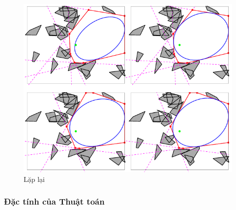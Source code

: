 \documentclass{article}
\begin{document}
\begin{figure}[!htp]
    \centering
    \includegraphics[width=0.5\linewidth]{imgs/iris-3.png}
    \caption{Lặp lại}
\end{figure}

\newpage
\subsubsection{Đặc tính của Thuật toán}
\end{document}
